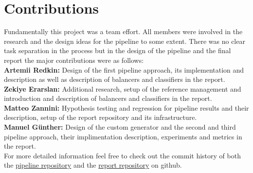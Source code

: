 \section{Contributions}

Fundamentally this project was a team effort. All members were involved in the research and the design ideas for the pipeline to some extent.
There was no clear task separation in the process but in the design of the pipeline and the final report the major contributions were as follows:\\

\textbf{Artemii Redkin:} Design of the first pipeline approach, its implementation and description as well as description of balancers and classifiers in the report.\\

\textbf{Zekiye Erarslan:} Additional research, setup of the reference management and introduction and description of balancers and classifiers in the report.\\

\textbf{Matteo Zannini:} Hypothesis testing and regression for pipeline results and their description, setup of the report repository and its infrastructure.\\

\textbf{Manuel Günther:} Design of the custom generator and the second and third pipeline approach, their implimentation description, experiments and metrics in the report.\\

For more detailed information feel free to check out the commit history of both the \href{https://github.com/gnthr-solve/TP_ML_Pipeline}{pipeline repository}
and the \href{https://github.com/gnthr-solve/TP_ML_PL_report}{report repository} on github.

